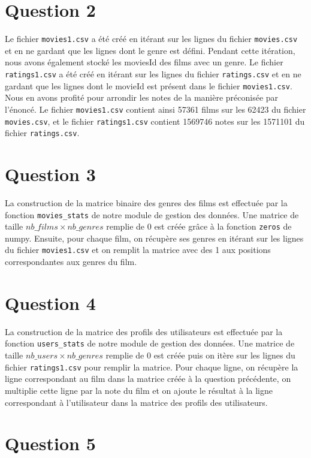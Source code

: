 \documentclass{article}
\begin{document}
\newpage
\section{Question 2}
Le fichier \texttt{movies1.csv} a été créé en itérant sur les lignes du fichier
\texttt{movies.csv} et en ne gardant que les lignes dont le genre est défini. Pendant
cette itération, nous avons également stocké les moviesId des films avec un genre.
\vskip 0.25cm
Le fichier \texttt{ratings1.csv} a été créé en itérant sur les lignes du fichier
\texttt{ratings.csv} et en ne gardant que les lignes dont le movieId est présent
dans le fichier \texttt{movies1.csv}. Nous en avons profité pour arrondir les
notes de la manière préconisée par l'énoncé.
\vskip 0.25cm
Le fichier \texttt{movies1.csv} contient ainsi 57361 films sur les 62423 du
fichier \texttt{movies.csv}, et le fichier \texttt{ratings1.csv} contient
1569746 notes sur les 1571101 du fichier \texttt{ratings.csv}.

\section{Question 3}
La construction de la matrice binaire des genres des films est effectuée par
la fonction \texttt{movies\_stats} de notre module de gestion des données.
\vskip 0.25cm
Une matrice de taille $nb\_films \times nb\_genres$ remplie de 0 est créée grâce
à la fonction \texttt{zeros} de numpy. Ensuite, pour chaque film, on récupère
ses genres en itérant sur les lignes du fichier \texttt{movies1.csv} et on
remplit la matrice avec des 1 aux positions correspondantes aux genres du film.

\section{Question 4}
La construction de la matrice des profils des utilisateurs est effectuée par
la fonction \texttt{users\_stats} de notre module de gestion des données.
\vskip 0.25cm
Une matrice de taille $nb\_users \times nb\_genres$ remplie de 0 est créée puis
on itère sur les lignes du fichier \texttt{ratings1.csv} pour remplir la matrice.
Pour chaque ligne, on récupère la ligne correspondant au film dans la matrice
créée à la question précédente, on multiplie cette ligne par la note du film
et on ajoute le résultat à la ligne correspondant à l'utilisateur dans la matrice
des profils des utilisateurs.

\newpage
\section{Question 5}
\end{document}
